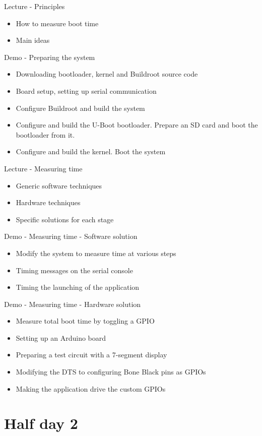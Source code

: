 \documentclass[a4paper,12pt,obeyspaces,spaces,hyphens]{article}
\begin{document}
\feagendatwocolumn
{Lecture - Principles}
{
  \begin{itemize}
  \item How to measure boot time
  \item Main ideas
  \end{itemize}
}
{Demo - Preparing the system}
{
 \begin{itemize}
 \item Downloading bootloader, kernel and Buildroot source code
 \item Board setup, setting up serial communication
 \item Configure Buildroot and build the system
 \item Configure and build the U-Boot bootloader. Prepare an SD card
       and boot the bootloader from it.
 \item Configure and build the kernel. Boot the system
 \end{itemize}
}

\feagendatwocolumn
{Lecture - Measuring time}
{
  \begin{itemize}
  \item Generic software techniques
  \item Hardware techniques
  \item Specific solutions for each stage
  \end{itemize}
}
{Demo - Measuring time - Software solution}
{
 \begin{itemize}
 \item Modify the system to measure time at various steps
 \item Timing messages on the serial console
 \item Timing the launching of the application
 \end{itemize}
}

\feagendaonecolumn
{Demo - Measuring time - Hardware solution}
{
  \begin{itemize}
  \item Measure total boot time by toggling a GPIO
  \item Setting up an Arduino board
  \item Preparing a test circuit with a 7-segment display
  \item Modifying the DTS to configuring Bone Black pins as GPIOs
  \item Making the application drive the custom GPIOs
  \end{itemize}
}

\section{Half day 2}
\end{document}
